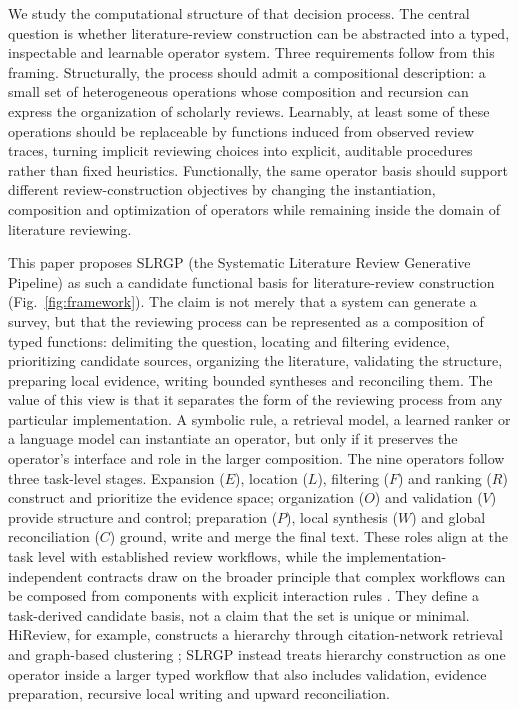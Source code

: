 \documentclass[11pt,a4paper]{article}
\begin{document}
We study the computational structure of that decision process. The central question is whether literature-review construction can be abstracted into a typed, inspectable and learnable operator system. Three requirements follow from this framing. Structurally, the process should admit a compositional description: a small set of heterogeneous operations whose composition and recursion can express the organization of scholarly reviews. Learnably, at least some of these operations should be replaceable by functions induced from observed review traces, turning implicit reviewing choices into explicit, auditable procedures rather than fixed heuristics. Functionally, the same operator basis should support different review-construction objectives by changing the instantiation, composition and optimization of operators while remaining inside the domain of literature reviewing.

This paper proposes SLRGP (the Systematic Literature Review Generative Pipeline) as such a candidate functional basis for literature-review construction (Fig.~\ref{fig:framework}). The claim is not merely that a system can generate a survey, but that the reviewing process can be represented as a composition of typed functions: delimiting the question, locating and filtering evidence, prioritizing candidate sources, organizing the literature, validating the structure, preparing local evidence, writing bounded syntheses and reconciling them. The value of this view is that it separates the form of the reviewing process from any particular implementation. A symbolic rule, a retrieval model, a learned ranker or a language model can instantiate an operator, but only if it preserves the operator's interface and role in the larger composition.
The nine operators follow three task-level stages. Expansion ($E$), location ($L$), filtering ($F$) and ranking ($R$) construct and prioritize the evidence space; organization ($O$) and validation ($V$) provide structure and control; preparation ($P$), local synthesis ($W$) and global reconciliation ($C$) ground, write and merge the final text. These roles align at the task level with established review workflows, while the implementation-independent contracts draw on the broader principle that complex workflows can be composed from components with explicit interaction rules \cite{workflowpatterns,interfaceautomata}. They define a task-derived candidate basis, not a claim that the set is unique or minimal. HiReview, for example, constructs a hierarchy through citation-network retrieval and graph-based clustering \cite{hireview}; SLRGP instead treats hierarchy construction as one operator inside a larger typed workflow that also includes validation, evidence preparation, recursive local writing and upward reconciliation.
\end{document}
